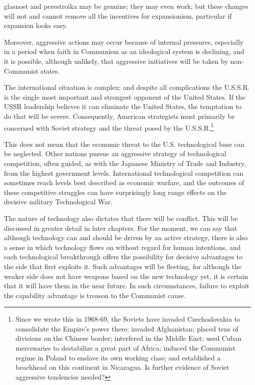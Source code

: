 glasnost and perestroika may be genuine; they may even work; but these changes will not and cannot remove all the incentives for expansionism, particular if expansion looks easy.

Moreover, aggressive actions may occur because of internal pressures, especially in a period when faith in Communism as an ideological system is declining, and it is possible, although unlikely, that aggressive initiatives will be taken by non-Communist states.

The international situation is complex; and despite all complications the U.S.S.R. is the single most important and strongest opponent of the United States. If the USSR leadership believes it can eliminate the United States, the temptation to do that will be severe. Consequently, American strategists must primarily be concerned with Soviet strategy and the threat posed by the U.S.S.R.\footnote{Since we wrote this in 1968-69, the Soviets have invaded Czechoslovakia to consolidate the Empire's power there; invaded Afghanistan; placed tens of divisions on the Chinese border; interfered in the Middle East; used Cuban mercenaries to destabilize a great part of Africa; induced the Communist regime in Poland to enslave its own working class; and established a beachhead on this continent in Nicaragua. Is further evidence of Soviet aggressive tendencies needed?}

This does not mean that the economic threat to the U.S. technological base can be neglected. Other nations pursue an aggressive strategy of technological competition, often guided, as with the Japanese Ministry of Trade and Industry, from the highest government levels. International technological competition can sometimes reach levels best described as economic warfare, and the outcomes of these competitive struggles can have surprisingly long range effects on the decisive military Technological War.

The nature of technology also dictates that there will be conflict. This will be discussed in greater detail in later chapters. For the moment, we can say that although technology can and should be driven by an active strategy, there is also a sense in which technology flows on without regard for human intentions, and each technological breakthrough offers the possibility for decisive advantages to the side that first exploits it. Such advantages will be fleeting, for although the weaker side does not have weapons based on the new technology yet, it is certain that it will have them in the near future. In such circumstances, failure to exploit the capability advantage is treason to the Communist cause.

